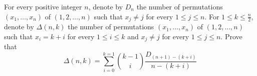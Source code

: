 For every positive integer \(n\), denote by \(D_n\) the number of permutations \((x_1, \dots, x_n)\) of \((1,2,\dots, n)\) such that \(x_j\neq j\) for every \(1\le j\le n\). For \(1\le k\le \frac{n}{2}\), denote by \(\Delta (n,k)\) the number of permutations \((x_1,\dots, x_n)\) of \((1,2,\dots, n)\) such that \(x_i=k+i\) for every \(1\le i\le k\) and \(x_j\neq j\) for every \(1\le j\le n\). Prove that
\[\Delta (n,k)=\sum_{i=0}^{k=1} \binom{k-1}{i} \frac{D_{(n+1)-(k+i)}}{n-(k+i)}\]
